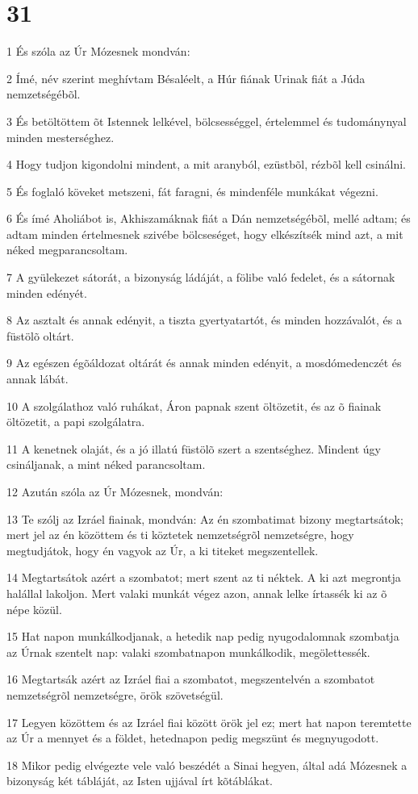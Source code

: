 \chapter{31}

\par 1 És szóla az Úr Mózesnek mondván:
\par 2 Ímé, név szerint meghívtam Bésaléelt, a Húr fiának Urinak fiát a Júda nemzetségébõl.
\par 3 És betöltöttem õt Istennek lelkével, bölcsességgel, értelemmel és tudománynyal minden mesterséghez.
\par 4 Hogy tudjon kigondolni mindent, a mit aranyból, ezüstbõl, rézbõl kell csinálni.
\par 5 És foglaló köveket metszeni, fát faragni, és mindenféle munkákat végezni.
\par 6 És ímé Aholiábot is, Akhiszamáknak fiát a Dán nemzetségébõl, mellé adtam; és adtam minden értelmesnek szivébe bölcseséget, hogy elkészítsék mind azt, a mit néked megparancsoltam.
\par 7 A gyülekezet sátorát, a bizonyság ládáját, a fölibe való fedelet, és a sátornak minden edényét.
\par 8 Az asztalt és annak edényit, a tiszta gyertyatartót, és minden hozzávalót, és a füstölõ oltárt.
\par 9 Az egészen égõáldozat oltárát és annak minden edényit, a mosdómedenczét és annak lábát.
\par 10 A szolgálathoz való ruhákat, Áron papnak szent öltözetit, és az õ fiainak öltözetit, a papi szolgálatra.
\par 11 A kenetnek olaját, és a jó illatú füstölõ szert a szentséghez. Mindent úgy csináljanak, a mint néked parancsoltam.
\par 12 Azután szóla az Úr Mózesnek, mondván:
\par 13 Te szólj az Izráel fiainak, mondván: Az én szombatimat bizony megtartsátok; mert jel az én közöttem és ti köztetek nemzetségrõl nemzetségre, hogy megtudjátok, hogy én vagyok az Úr, a ki titeket megszentellek.
\par 14 Megtartsátok azért a szombatot; mert szent az ti néktek. A ki azt megrontja halállal lakoljon. Mert valaki munkát végez azon, annak lelke írtassék ki az õ népe közül.
\par 15 Hat napon munkálkodjanak, a hetedik nap pedig nyugodalomnak szombatja az Úrnak szentelt nap: valaki szombatnapon munkálkodik, megölettessék.
\par 16 Megtartsák azért az Izráel fiai a szombatot, megszentelvén a szombatot nemzetségrõl nemzetségre, örök szövetségül.
\par 17 Legyen közöttem és az Izráel fiai között örök jel ez; mert hat napon teremtette az Úr a mennyet és a földet, hetednapon pedig megszünt és megnyugodott.
\par 18 Mikor pedig elvégezte vele való beszédét a Sinai hegyen, által adá Mózesnek a bizonyság két tábláját, az Isten ujjával írt kõtáblákat.

